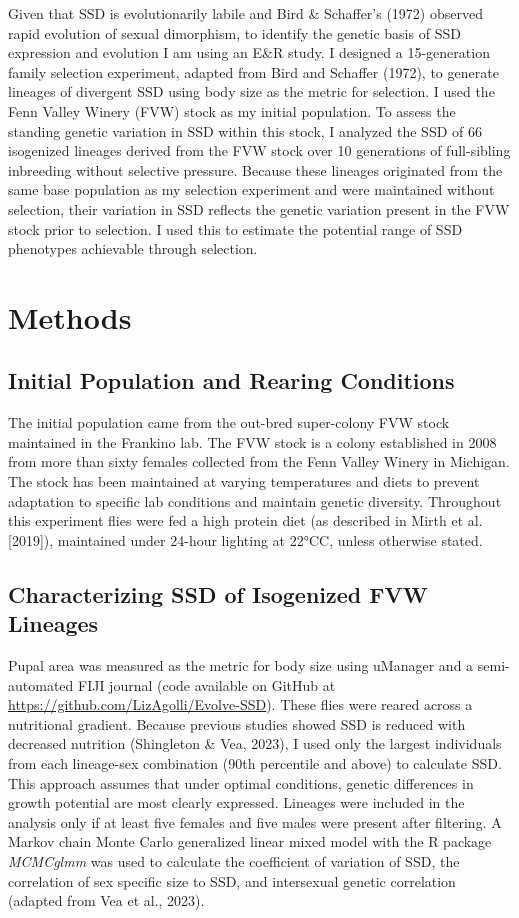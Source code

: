 \documentclass[12pt,reqno,oneside]{report}
\begin{document}
Given that SSD is evolutionarily labile and Bird \& Schaffer's (1972) observed rapid evolution of sexual dimorphism, to identify the genetic basis of SSD expression and evolution I am using an E\&R study. I designed a 15-generation family selection experiment, adapted from Bird and Schaffer (1972), to generate lineages of divergent SSD using body size as the metric for selection. I used the Fenn Valley Winery (FVW) stock as my initial population. To assess the standing genetic variation in SSD within this stock, I analyzed the SSD of 66 isogenized lineages derived from the FVW stock over 10 generations of full-sibling inbreeding without selective pressure. Because these lineages originated from the same base population as my selection experiment and were maintained without selection, their variation in SSD reflects the genetic variation present in the FVW stock prior to selection. I used this to estimate the potential range of SSD phenotypes achievable through selection.

\section{Methods}

\subsection{Initial Population and Rearing Conditions} 

The initial population came from the out-bred super-colony FVW stock maintained in the Frankino lab. The FVW stock is a colony established in 2008 from more than sixty females collected from the Fenn Valley Winery in Michigan. The stock has been maintained at varying temperatures and diets to prevent adaptation to specific lab conditions and maintain genetic diversity. Throughout this experiment flies were fed a high protein diet (as described in Mirth et al. [2019]), maintained under 24-hour lighting at 22\si{\celsius}C, unless otherwise stated.

\subsection{Characterizing SSD of Isogenized FVW Lineages}
Pupal area was measured as the metric for body size using uManager and a semi-automated FIJI journal (code available on GitHub at \url{https://github.com/LizAgolli/Evolve-SSD}). These flies were reared across a nutritional gradient. Because previous studies showed SSD is reduced with decreased nutrition (Shingleton \& Vea, 2023), I used only the largest individuals from each lineage-sex combination (90th percentile and above) to calculate SSD. This approach assumes that under optimal conditions, genetic differences in growth potential are most clearly expressed. Lineages were included in the analysis only if at least five females and five males were present after filtering. A Markov chain Monte Carlo generalized linear mixed model with the R package \textit{MCMCglmm} was used to calculate the coefficient of variation of SSD, the correlation of sex specific size to SSD, and intersexual genetic correlation (adapted from Vea et al., 2023).
\end{document}
